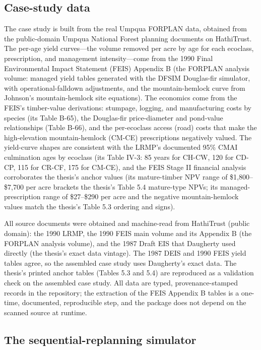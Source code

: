 \documentclass[12pt]{article}
\begin{document}
\hypertarget{case-study-data}{%
\subsection{Case-study data}\label{case-study-data}}

The case study is built from the real Umpqua FORPLAN data, obtained from the public-domain Umpqua National Forest planning documents on HathiTrust. The per-age yield curves---the volume removed per acre by age for each ecoclass, prescription, and management intensity---come from the 1990 Final Environmental Impact Statement (FEIS) Appendix B (the FORPLAN analysis volume: managed yield tables generated with the DFSIM Douglas-fir simulator, with operational-falldown adjustments, and the mountain-hemlock curve from Johnson's mountain-hemlock site equations). The economics come from the FEIS's timber-value derivations: stumpage, logging, and manufacturing costs by species (its Table B-65), the Douglas-fir price-diameter and pond-value relationships (Table B-66), and the per-ecoclass access (road) costs that make the high-elevation mountain-hemlock (CM-CE) prescriptions negatively valued. The yield-curve shapes are consistent with the LRMP's documented 95\% CMAI culmination ages by ecoclass (its Table IV-3: 85 years for CH-CW, 120 for CD-CP, 115 for CR-CF, 175 for CM-CE), and the FEIS Stage II financial analysis corroborates the thesis's anchor values (its mature-timber NPV range of \$1,800--\$7,700 per acre brackets the thesis's Table 5.4 mature-type NPVs; its managed-prescription range of \$27--\$290 per acre and the negative mountain-hemlock values match the thesis's Table 5.3 ordering and signs).

All source documents were obtained and machine-read from HathiTrust (public domain): the 1990 LRMP, the 1990 FEIS main volume and its Appendix B (the FORPLAN analysis volume), and the 1987 Draft EIS that Daugherty used directly (the thesis's exact data vintage). The 1987 DEIS and 1990 FEIS yield tables agree, so the assembled case study uses Daugherty's exact data. The thesis's printed anchor tables (Tables 5.3 and 5.4) are reproduced as a validation check on the assembled case study. All data are typed, provenance-stamped records in the repository; the extraction of the FEIS Appendix B tables is a one-time, documented, reproducible step, and the package does not depend on the scanned source at runtime.

\hypertarget{the-sequential-replanning-simulator}{%
\subsection{The sequential-replanning simulator}\label{the-sequential-replanning-simulator}}
\end{document}
